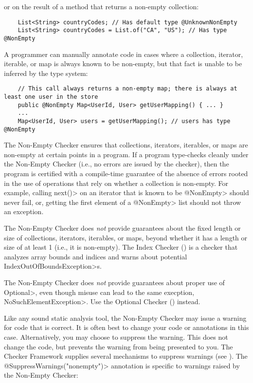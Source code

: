 \noindent
or on the result of a method that returns a non-empty collection:

\begin{Verbatim}
    List<String> countryCodes; // Has default type @UnknownNonEmpty
    List<String> countryCodes = List.of("CA", "US"); // Has type @NonEmpty
\end{Verbatim}

A programmer can manually annotate code in cases where a collection,
iterator, iterable, or map is always known to be non-empty, but that fact is
unable to be inferred by the type system:

\begin{Verbatim}
    // This call always returns a non-empty map; there is always at least one user in the store
    public @NonEmpty Map<UserId, User> getUserMapping() { ... }
    ...
    Map<UserId, User> users = getUserMapping(); // users has type @NonEmpty
\end{Verbatim}


The Non-Empty Checker ensures that collections, iterators, iterables, or maps
are non-empty at certain points in a program.
If a program type-checks cleanly under the Non-Empty Checker (i.e., no errors
are issued by the checker), then the program is certified with a compile-time
guarantee of the absence of errors rooted in the use of operations that
rely on whether a collection is non-empty.
For example, calling \<next()> on an iterator that is known to be \<@NonEmpty>
should never fail, or, getting the first element of a \<@NonEmpty> list should
not throw an exception.

The Non-Empty Checker does \emph{not} provide guarantees about the fixed
length or size of collections, iterators, iterables, or maps, beyond whether
it has a length or size of at least 1 (i.e., it is non-empty).
The Index Checker () is a checker that analyzes
array bounds and indices and warns about potential
\<IndexOutOfBoundsException>s.

The Non-Empty Checker does \emph{not} provide guarantees about proper use
of \<Optional>, even though misuse can lead to the same execption,
\<NoSuchElementException>.  Use the Optional Checker
() instead.



Like any sound static analysis tool, the Non-Empty Checker may issue a warning
for code that is correct.
It is often best to change your code or annotations in this case.
Alternatively, you may choose to suppress the warning.
This does not change the code, but prevents the warning from being presented to
you.
The Checker Framework supplies several mechanisms to suppress warnings (see
).
The \<@SuppressWarnings("nonempty")> annotation is specific to warnings raised
by the Non-Empty Checker:

